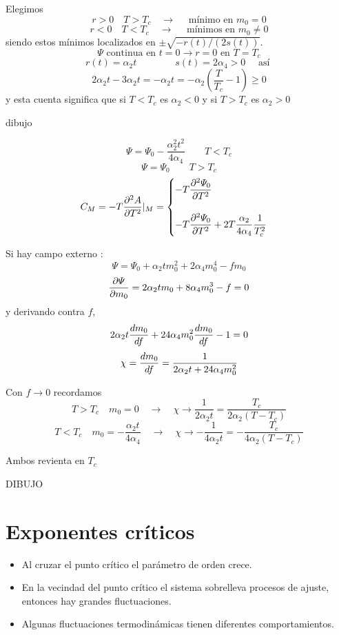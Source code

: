 \documentclass[10pt,oneside]{CBFT_book}
\begin{document}
Elegimos
\[
	r > 0 \quad T > T_c \quad \rightarrow \quad \text{ mínimo en } m_0 = 0
\]
\[
	r < 0 \quad T < T_c \quad \rightarrow \quad \text{ mínimos en } m_0 \neq 0
\]
siendo estos mínimos localizados en $\pm \sqrt{ -r(t)/(2s(t))}$.
\[
	\Psi \text{ continua en } t=0 \rightarrow r=0 \text{ en } T=T_c
\]
\[
	r(t) = \alpha_2 t \qquad \qquad s(t) = 2 \alpha_4 > 0 \quad \text{ así }
\]
\[
	2 \alpha_2 t - 3 \alpha_2 t = - \alpha_2 t = -\alpha_2 \left( \frac{T}{T_c} - 1 \right)\geq 0
\]
y esta cuenta significa que si $T<T_c$ es $\alpha_2 <0$ y si $T>T_c$ es $\alpha_2 >0$

dibujo

\[
	\Psi = \Psi_0 - \frac{\alpha_2^2t^2}{4\alpha_4} \qquad T < T_c
\]
\[
	\Psi = \Psi_0 \qquad T>T_c
\]
\[
	C_M = - T \dpar[2]{A}{T}|_M = \begin{cases}
	                        \displaystyle -T \dpar[2]{\Psi_0}{T} \\
	                        \\
	                        \displaystyle -T \dpar[2]{\Psi_0}{T} + 2 T \frac{\alpha_2}{4\alpha_4} \frac{1}{T_c^2}
	                        \end{cases}
\]

Si hay campo externo :
\[
	\Psi = \Psi_0 + \alpha_2 t m_0^2 + 2 \alpha_4 m_0^4 - f m_0
\]
\[
	\dpar{\Psi}{m_0} = 2 \alpha_2 t m_0 + 8 \alpha_4 m_0^3 - f =  0
\]
y derivando contra $f$,
\[
	2 \alpha_2 t \dtot{m_0}{f} + 24 \alpha_4 m_0^2 \dtot{m_0}{f} - 1 = 0
\]
\[
	\chi = \dtot{m_0}{f} = \frac{1}{2\alpha_2 t + 24 \alpha_4 m_0^2}
\]

Con $f \to 0$ recordamos
\[
	T > T_c \quad m_0 = 0 \quad \rightarrow \quad \chi \to \frac{1}{2\alpha_2 t} = 
	\frac{T_c}{2\alpha_2(T-T_c)}
\]
\[
	T < T_c \quad m_0 = -\frac{\alpha_2 t}{4\alpha_4} \quad \rightarrow \quad \chi \to 
	-\frac{1}{4\alpha_2 t} = -\frac{T_c}{4\alpha_2(T-T_c)}
\]

Ambos revienta en $T_c$

DIBUJO

\section{Exponentes críticos}

\begin{itemize}
 \item Al cruzar el punto crítico el parámetro de orden crece.
 \item En la vecindad del punto crítico el sistema sobrelleva procesos de ajuste, entonces
 hay grandes fluctuaciones.
 \item Algunas fluctuaciones termodinámicas tienen diferentes comportamientos.
\end{itemize}
\end{document}
